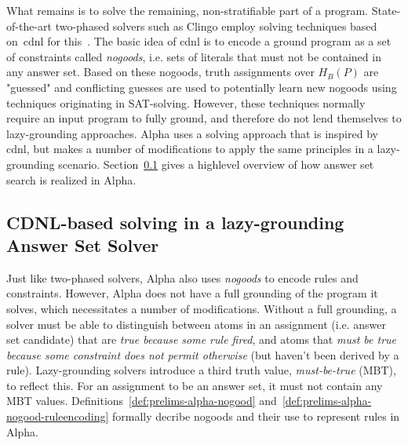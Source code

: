 What remains is to solve the remaining, non-stratifiable part of a program. State-of-the-art two-phased solvers such as Clingo employ solving techniques based on~\gls{cdnl} for this~\cite{clasp-cdnl}. The basic idea of \gls{cdnl} is to encode a ground program as a set of constraints called \emph{nogoods}, i.e. sets of literals that must not be contained in any answer set. Based on these nogoods, truth assignments over $H_B(P)$ are "guessed" and conflicting guesses are used to potentially learn new nogoods using techniques originating in SAT-solving. However, these techniques normally require an input program to fully ground, and therefore do not lend themselves to lazy-grounding approaches. Alpha uses a solving approach that is inspired by \gls{cdnl}, but makes a number of modifications to apply the same principles in a lazy-grounding scenario. Section~\ref{subsec:prelims-lazygrounding-alpha-cdnl} gives a highlevel overview of how answer set search is realized in Alpha.

\subsection{CDNL-based solving in a lazy-grounding Answer Set Solver}
\label{subsec:prelims-lazygrounding-alpha-cdnl}

Just like two-phased solvers, Alpha also uses \emph{nogoods} to encode rules and constraints. However, Alpha does not have a full grounding of the program it solves, which necessitates a number of modifications. Without a full grounding, a solver must be able to distinguish between atoms in an assignment (i.e. answer set candidate) that are \emph{true because some rule fired}, and atoms that \emph{must be true because some constraint does not permit otherwise} (but haven't been derived by a rule). Lazy-grounding solvers introduce a third truth value, \emph{must-be-true} (MBT), to reflect this. For an assignment to be an answer set, it must not contain any MBT values. Definitions~\ref{def:prelims-alpha-nogood} and~\ref{def:prelims-alpha-nogood-ruleencoding} formally decribe nogoods and their use to represent rules in Alpha.

